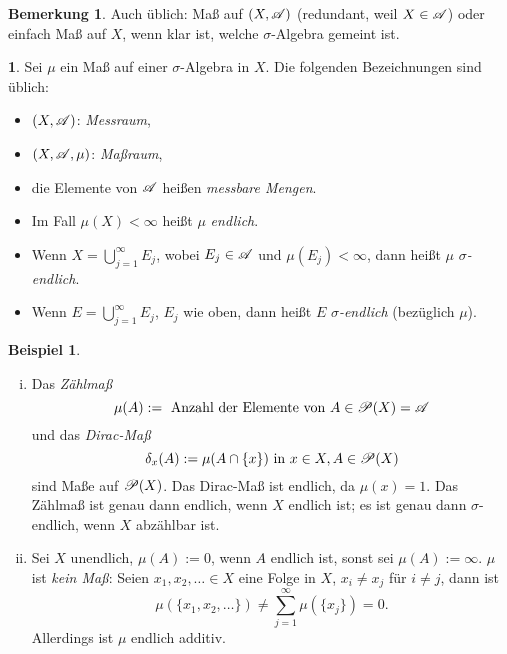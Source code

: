 \documentclass[
 a4paper,
 12pt,
 parskip=half
 ]{scrreprt}
\theoremstyle{plain}
\theoremstyle{definition}
\newtheorem{exmp}[thm]{Beispiel}
\newtheorem{prgp}[thm]{} %
\newtheorem*{rmrk*}{Bemerkung}
\numberwithin{equation}{section}
\begin{document}
\begin{rmrk*}
 Auch üblich: Maß auf $(X, \mathscr{A})$ (redundant, weil $X \in \mathscr{A}$) oder einfach Maß auf $X$, wenn klar ist, welche $\sigma$-Algebra gemeint ist.
\end{rmrk*}

\begin{prgp}
 Sei $\mu$ ein Maß auf einer $\sigma$-Algebra in $X$. Die folgenden Bezeichnungen sind üblich:
 \begin{itemize}
  \item $(X,\mathscr{A})$: \emph{Messraum},
  \item $(X,\mathscr{A},\mu)$: \emph{Maßraum},
  \item die Elemente von $\mathscr{A}$ heißen \emph{messbare Mengen}.
  \item Im Fall $\mu(X) < \infty$ heißt $\mu$ \emph{endlich}.
  \item Wenn $X = \bigcup_{j=1}^\infty E_j$, wobei $E_j \in \mathscr{A}$ und $\mu(E_j) < \infty$, dann heißt $\mu$ \emph{$\sigma$-endlich}.
  \item Wenn $E = \bigcup_{j=1}^\infty E_j$, $E_j$ wie oben, dann heißt $E$ \emph{$\sigma$-endlich} (bezüglich $\mu$).
 \end{itemize}
\end{prgp}

\begin{exmp}
 \begin{enumerate}[(i)]
  \item Das \emph{Zählmaß} 
   \[ \mu(A) := \text{ Anzahl der Elemente von } A \in \mathscr{P}(X) = \mathscr{A} \]
   und das \emph{Dirac-Maß} 
   \[ \delta_x(A) := \mu(A \cap \{x\}) \text{ in } x \in X, A \in \mathscr{P}(X) \]
   sind Maße auf $\mathscr{P}(X)$. Das Dirac-Maß ist endlich, da $\mu(x) = 1$. Das Zählmaß ist genau dann endlich, wenn $X$ endlich ist; es ist genau dann $\sigma$-endlich, wenn $X$ abzählbar ist.
  \item Sei $X$ unendlich, $\mu(A) := 0$, wenn $A$ endlich ist, sonst sei $\mu(A) := \infty$. $\mu$ ist \emph{kein Maß}: Seien $x_1, x_2, \ldots \in X$ eine Folge in $X$, $x_i \ne x_j$ für $i \ne j$, dann ist
  \[ \mu( \{ x_1, x_2, \ldots \} ) \ne \sum_{j=1}^\infty \mu( \{ x_j \} ) = 0. \]
  Allerdings ist $\mu$ endlich additiv.
 \end{enumerate}
\end{exmp}
\end{document}
